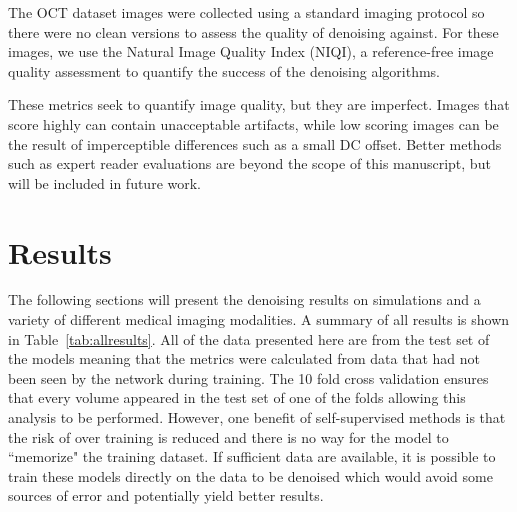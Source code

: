 \documentclass[journal,twoside,web]{ieeecolor}
\begin{document}
The OCT dataset images were collected using a standard imaging protocol so there were no clean versions to assess the quality of denoising against. For these images, we use the Natural Image Quality Index (NIQI), a reference-free image quality assessment to quantify the success of the denoising algorithms\cite{Mittal2013}.

These metrics seek to quantify image quality, but they are imperfect. Images that score highly can contain unacceptable artifacts, while low scoring images  can be the result of imperceptible differences such as a small DC offset. Better methods such as expert reader evaluations are beyond the scope of this manuscript, but will be included in future work.

\section{Results}

The following sections will present the denoising results on simulations and a variety of different medical imaging modalities. A summary of all results is shown in Table~\ref{tab:allresults}. All of the data presented here are from the test set of the models meaning that the metrics were calculated from data that had not been seen by the network during training. The 10 fold cross validation ensures that every volume appeared in the test set of one of the folds allowing this analysis to be performed. However, one benefit of self-supervised methods is that the risk of over training is reduced and there is no way for the model to ``memorize" the training dataset. If sufficient data are available, it is possible to train these models directly on the data to be denoised which would avoid some sources of error and potentially yield better results.
\end{document}
